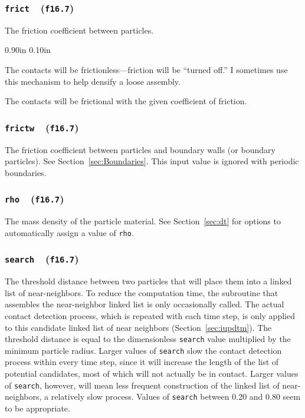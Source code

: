 \documentclass[letterpaper,11pt]{article}
\newcommand{\Var}[2]{\texttt{#1}\ \  (\texttt{#2})}
\newlength{\Labelwidth}
\newcommand{\Entrylabel}[1]{\makebox[\Labelwidth][r]{\texttt{#1}}}
\newenvironment{Options}
{\begin{list}{}{%
\renewcommand{\makelabel}{\Entrylabel}%
\setlength{\leftmargin} {0.90in}%
\setlength{\rightmargin}{0.00in}%
\setlength{\labelsep}   {0.10in}%
\setlength{\labelwidth} {\Labelwidth}%
}}
{\end{list}}
\begin{document}
\subsubsection[\texttt{frict}]{\Var{frict}{f16.7}}\label{sec:frict}
The friction coefficient between particles.
\begin{Options}
\item[frict=0.]
The contacts will be frictionless---friction will be ``turned off.''
I sometimes use this mechanism to help densify a loose assembly.
\item[frict>0.]
The contacts will be frictional with the given coefficient of friction.
\end{Options}
%
\subsubsection[\texttt{frictw}]{\Var{frictw}{f16.7}}\label{sec:frictw}
The friction coefficient between particles and boundary walls (or
boundary particles).  See Section~\ref{sec:Boundaries}.
This input value is ignored with periodic boundaries.
%
\subsubsection[\texttt{rho}]{\Var{rho}{f16.7}}\label{sec:rho}
The mass density of the particle material.
See Section~\ref{sec:dt} for options to automatically assign
a value of \texttt{rho}.
\subsubsection[\texttt{search}]{\Var{search}{f16.7}}\label{sec:search}
The threshold distance between two particles that will place them
into a linked list of near-neighbors.
To reduce the computation time,
the subroutine that assembles the near-neighbor 
linked list is only occasionally
called.
The actual contact detection process, which is repeated with each time
step, is only applied to this candidate linked list of near neighbors
(Section~\ref{sec:iupdtm}).
The threshold distance is equal to the dimensionless \texttt{search} 
value multiplied by the minimum particle radius.
Larger values of \texttt{search} slow the contact detection process
within every time step, 
since it will increase the length of the list of potential candidates,
most of which will not actually be in contact.
Larger values of \texttt{search}, however, will mean less frequent
construction
of the linked list of near-neighbors, a relatively slow process.
Values of \texttt{search} between 0.20 and 0.80 seem to be appropriate.
\end{document}
